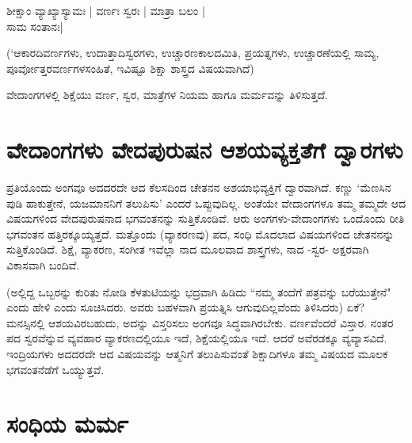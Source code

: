 \begin{shloka}
ಶೀಕ್ಷಾಂ ವ್ಯಾಖ್ಯಾಸ್ಯಾಮಃ | ವರ್ಣಃ ಸ್ವರಃ | ಮಾತ್ರಾ ಬಲಂ |\label{10a}\\
ಸಾಮ ಸಂತಾನಃ|
\end{shloka}

(`ಆಕಾರದಿವರ್ಣಗಳು, ಉದಾತ್ತಾದಿಸ್ವರಗಳು, ಉಚ್ಚಾರಣಕಾಲದಮಿತಿ, ಪ್ರಯತ್ನಗಳು, ಉಚ್ಚಾರಣೆಯಲ್ಲಿ ಸಾಮ್ಯ, ಪೂರ್ವೋತ್ತರವರ್ಣಗಳಸಂಹಿತೆ, ಇವಿಷ್ಟೂ ಶಿಕ್ಷಾ ಶಾಸ್ತ್ರದ ವಿಷಯವಾಗಿದೆ)

ವೇದಾಂಗಗಳಲ್ಲಿ ಶಿಕ್ಷೆಯು ವರ್ಣ, ಸ್ವರ, ಮಾತ್ರೆಗಳ ನಿಯಮ ಹಾಗೂ ಮರ್ಮವನ್ನು ತಿಳಿಸುತ್ತದೆ.

\section*{ವೇದಾಂಗಗಳು ವೇದಪುರುಷನ ಆಶಯವ್ಯಕ್ತತೆಗೆ ದ್ವಾರಗಳು}

ಪ್ರತಿಯೊಂದು ಅಂಗವೂ ಅದದರದೇ ಆದ ಕೆಲಸದಿಂದ ಚೇತನನ ಅಶಯಾಭಿವ್ಯಕ್ತಿಗೆ ದ್ವಾರವಾಗಿದೆ. ಕಣ್ಣು `ಮೆಣಸಿನ ಪುಡಿ ಹಾಕುತ್ತೇನೆ, ಯಜಮಾನನಿಗೆ ತಲುಪಿಸು' ಎಂದರೆ ಒಪ್ಪುವುದಿಲ್ಲ. ಅಂತೆಯೇ ವೇದಾಂಗಗಳೂ ತಮ್ಮ ತಮ್ಮದೇ ಆದ ವಿಷಯಗಳಿಂದ ವೇದಪುರುಷನಾದ ಭಗವಂತನನ್ನು ಸುತ್ತಿಕೊಂಡಿವೆ. ಆರು ಅಂಗಗಳು-ವೇದಾಂಗಗಳು ಒಂದೊಂದು ರೀತಿ ಭಗವಂತನ ಹತ್ತಿರಕ್ಕೂಯ್ಯತ್ತದೆ. ಮತ್ತೊಂದು (ವ್ಯಾಕರಣವು) ಪದ, ಸಂಧಿ ಮೊದಲಾದ ವಿಷಯಗಳಿಂದ ಚೇತನನನ್ನು ಸುತ್ತಿಕೊಂಡಿದೆ. ಶಿಕ್ಷೆ, ವ್ಯಾಕರಣ, ಸಂಗೀತ ಇವೆಲ್ಲಾ ನಾದ ಮೂಲವಾದ ಶಾಸ್ತ್ರಗಳು, ನಾದ -ಸ್ವರ- ಅಕ್ಷರವಾಗಿ ವಿಕಾಸವಾಗಿ ಬಂದಿವೆ. 

(ಅಲ್ಲಿದ್ದ ಒಬ್ಬರನ್ನು ಕುರಿತು ನೋಡಿ ಕೆಳತುಟಿಯನ್ನು ಭದ್ರವಾಗಿ ಹಿಡಿದು ``ನಮ್ಮ ತಂದೆಗೆ ಪತ್ರವನ್ನು ಬರೆಯುತ್ತೇನೆ" ಎಂದು ಹೇಳಿ ಎಂದು ಸೂಚಿಸಿದರು. ಅವರು ಬಹಳವಾಗಿ ಪ್ರಯತ್ನಿಸಿ ಆಗುವುದಿಲ್ಲವೆಂದು ತಿಳಿಸಿದರು) ಏಕೆ? ಮನಸ್ಸಿನಲ್ಲಿ ಆಶಯವಿರಬಹುದು, ಅದನ್ನು ವಿಸ್ತರಿಸಲು ಅಂಗವೂ ಸಿದ್ಧವಾಗಿರಬೇಕು. ವರ್ಣವೆಂದರೆ ವಿಸ್ತಾರ. ನಂತರ ಪದ ಸ್ವರವೆನ್ನುವ ವ್ಯವಹಾರ ವ್ಯಾಕರಣದಲ್ಲಿಯೂ ಇದೆ, ಶಿಕ್ಷೆಯಲ್ಲಿಯೂ ಇದೆ. ಆದರೆ ಅವೆರಡಕ್ಕೂ ವ್ಯವ್ಯಾಸವಿದೆ. ಇಂದ್ರಿಯಗಳು ಅದದರದೇ ಆದ ವಿಷಯವನ್ನು ಆತ್ಮನಿಗೆ ತಲುಪಿಸುವಂತೆ ಶಿಕ್ಷಾದಿಗಳೂ ತಮ್ಮ ವಿಷಯದ ಮೂಲಕ ಭಗವಂತನೆಡೆಗೆ  ಒಯ್ಯುತ್ತವೆ.

\section*{ಸಂಧಿಯ ಮರ್ಮ}

